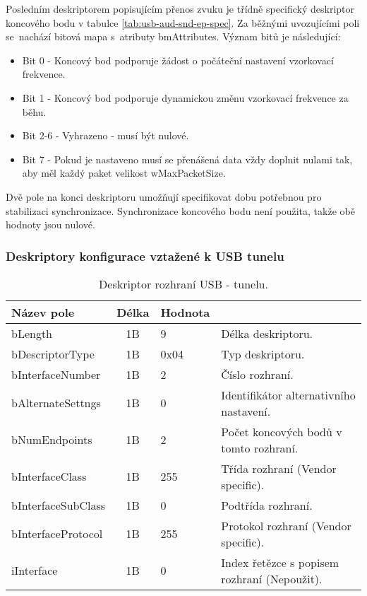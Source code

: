 Posledním deskriptorem popisujícím přenos zvuku je třídně specifický deskriptor koncového bodu v tabulce \ref{tab:usb-aud-snd-ep-spec}. Za běžnými uvozujícími poli se~nachází bitová mapa s~atributy bmAttributes. Význam bitů je následující:
\begin{itemize}
\item Bit 0 - Koncový bod podporuje žádost o počáteční nastavení vzorkovací frekvence.
\item Bit 1 - Koncový bod podporuje dynamickou změnu vzorkovací frekvence za běhu.
\item Bit 2-6 - Vyhrazeno - musí být nulové.
\item Bit 7 - Pokud je nastaveno musí se přenášená data vždy doplnit nulami tak, aby měl každý paket velikost wMaxPacketSize.
\end{itemize}

Dvě pole na konci deskriptoru umožňují specifikovat dobu potřebnou pro stabilizaci synchronizace. Synchronizace koncového bodu není použita, takže obě hodnoty jsou nulové.

\clearpage

\subsubsection{Deskriptory konfigurace vztažené k USB \iic tunelu}

\begin{table}[ht!]
\begin{center}
\begin{tabular}{|l|c|l|l|}
\hline 
Název pole & Délka & Hodnota &  \\ 
\hline
bLength & 1B & 9 & Délka deskriptoru.\\
\hline
bDescriptorType & 1B & 0x04 & Typ deskriptoru. \\
\hline
bInterfaceNumber & 1B & 2 & Číslo rozhraní. \\
\hline
bAlternateSettngs & 1B & 0 & Identifikátor alternativního nastavení.\\
\hline
bNumEndpoints & 1B & 2 & Počet koncových bodů v tomto rozhraní.\\ 
\hline
bInterfaceClass & 1B & 255 & Třída rozhraní (Vendor specific). \\  
\hline
bInterfaceSubClass & 1B & 0 & Podtřída rozhraní. \\
\hline 
bInterfaceProtocol & 1B & 255 & Protokol rozhraní (Vendor specific). \\ %
\hline 
iInterface & 1B & 0 & Index řetězce s popisem rozhraní (Nepoužit). \\  
\hline
\end{tabular} 
\end{center}
\caption{Deskriptor rozhraní USB - \iic tunelu.}
\label{tab:usb-tun-iface} 
\end{table}

